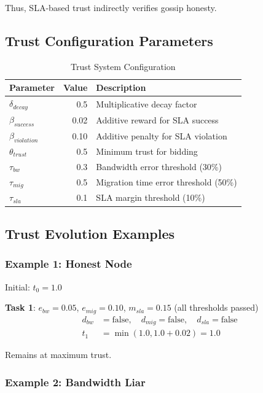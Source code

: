 \documentclass[12pt,a4paper]{article}
\begin{document}
Thus, SLA-based trust indirectly verifies gossip honesty.

\subsection{Trust Configuration Parameters}

\begin{table}[h]
\centering
\begin{tabular}{@{}lrl@{}}
\toprule
\textbf{Parameter} & \textbf{Value} & \textbf{Description} \\ \midrule
$\delta_{decay}$ & 0.5 & Multiplicative decay factor \\
$\beta_{success}$ & 0.02 & Additive reward for SLA success \\
$\beta_{violation}$ & 0.10 & Additive penalty for SLA violation \\
$\theta_{trust}$ & 0.5 & Minimum trust for bidding \\
$\tau_{bw}$ & 0.3 & Bandwidth error threshold (30\%) \\
$\tau_{mig}$ & 0.5 & Migration time error threshold (50\%) \\
$\tau_{sla}$ & 0.1 & SLA margin threshold (10\%) \\ \bottomrule
\end{tabular}
\caption{Trust System Configuration}
\end{table}

\subsection{Trust Evolution Examples}

\subsubsection{Example 1: Honest Node}

Initial: $t_0 = 1.0$

\textbf{Task 1}: $e_{bw} = 0.05$, $e_{mig} = 0.10$, $m_{sla} = 0.15$ (all thresholds passed)
\begin{align}
    d_{bw} &= \text{false}, \quad d_{mig} = \text{false}, \quad d_{sla} = \text{false} \\
    t_1 &= \min(1.0, 1.0 + 0.02) = 1.0
\end{align}

Remains at maximum trust.

\subsubsection{Example 2: Bandwidth Liar}
\end{document}
